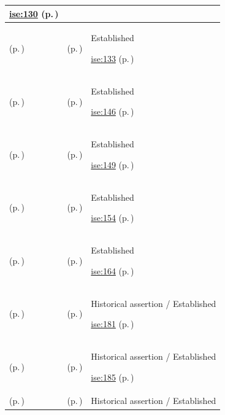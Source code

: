 \begin{longtable}{|>{\raggedright\arraybackslash}p{0.27\TableWidth}|>{\raggedright\arraybackslash}p{0.27\TableWidth}|>{\raggedright\arraybackslash}p{0.46\TableWidth}|}
 \hyperref[rad:ise:126]{ise:130} (p.\,\pageref{rad:ise:126})\\\hline
\nameref{function:map-clinical-concept} (p.\,\pageref{function:map-clinical-concept}) & \nameref{feature:feat-ise-15} (p.\,\pageref{feature:feat-ise-15}) & Established

 \hyperref[rad:ise:126]{ise:133} (p.\,\pageref{rad:ise:126})\\\hline
\nameref{function:coordinate-care-team-collaboration} (p.\,\pageref{function:coordinate-care-team-collaboration}) & \nameref{feature:feat-ise-16} (p.\,\pageref{feature:feat-ise-16}) & Established

 \hyperref[rad:ise:140]{ise:146} (p.\,\pageref{rad:ise:140})\\\hline
\nameref{function:resolve-lhr-query-within-collaboration} (p.\,\pageref{function:resolve-lhr-query-within-collaboration}) & \nameref{feature:feat-ise-17} (p.\,\pageref{feature:feat-ise-17}) & Established

 \hyperref[rad:ise:140]{ise:149} (p.\,\pageref{rad:ise:140})\\\hline
\nameref{function:govern-collaboration-metadata} (p.\,\pageref{function:govern-collaboration-metadata}) & \nameref{feature:feat-ise-18} (p.\,\pageref{feature:feat-ise-18}) & Established

 \hyperref[rad:ise:140]{ise:154} (p.\,\pageref{rad:ise:140})\\\hline
\nameref{function:coordinate-operational-collaboration} (p.\,\pageref{function:coordinate-operational-collaboration}) & \nameref{feature:feat-ise-19} (p.\,\pageref{feature:feat-ise-19}) & Established

 \hyperref[rad:ise:161]{ise:164} (p.\,\pageref{rad:ise:161})\\\hline
\nameref{function:coordinate-work-order} (p.\,\pageref{function:coordinate-work-order}) & \nameref{feature:feat-ise-20} (p.\,\pageref{feature:feat-ise-20}) & Historical assertion / Established

 \hyperref[rad:ise:171]{ise:181} (p.\,\pageref{rad:ise:171})\\\hline
\nameref{function:coordinate-to-do} (p.\,\pageref{function:coordinate-to-do}) & \nameref{feature:feat-ise-21} (p.\,\pageref{feature:feat-ise-21}) & Historical assertion / Established

 \hyperref[rad:ise:171]{ise:185} (p.\,\pageref{rad:ise:171})\\\hline
\nameref{function:coordinate-synthetic-task} (p.\,\pageref{function:coordinate-synthetic-task}) & \nameref{feature:feat-ise-22} (p.\,\pageref{feature:feat-ise-22}) & Historical assertion / Established


\end{longtable}
